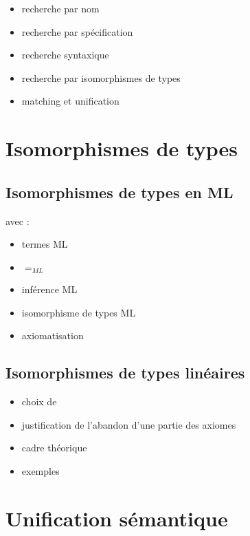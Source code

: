 \documentclass [a4paper] {report}
\theoremstyle {definition}
\begin{document}
\begin {itemize}
	\item recherche par nom
	\item recherche par spécification
	\item recherche syntaxique
	\item recherche par isomorphismes de types
	\item matching et unification
\end {itemize}


\chapter {Isomorphismes de types}

\section {Isomorphismes de types en ML}

avec \cite {dicosmo92} :
\begin {itemize}
	\item termes ML
	\item $=_{ML}$
	\item inférence ML
	\item isomorphisme de types ML
	\item axiomatisation
\end {itemize}

\section {Isomorphismes de types linéaires}

\begin {itemize}
	\item choix de \cite {rittri93}
	\item justification de l'abandon d'une partie des axiomes
	\item cadre théorique
	\item exemples
\end {itemize}


\chapter {Unification sémantique}
\end{document}
